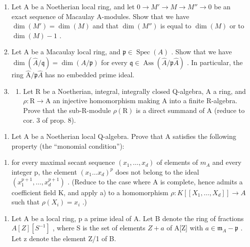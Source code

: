 
\begin{enumerate}
\def\labelenumi{\arabic{enumi})}
\item
  Let A be a Noetherian local ring, and let \(0 \to M' \to M \to M'' \to 0\) be an exact sequence of Macaulay A-modules. Show that we have \(\dim(M') = \dim(M)\) and that \(\dim(M'')\) is equal to \(\dim(M)\) or to \(\dim(M) - 1\) .
\item
  Let A be a Macaulay local ring, and \(\mathfrak{p} \in \operatorname{Spec}(A)\) . Show that we have \(\dim(\widehat{A}/\mathfrak{q}) = \dim(A/\mathfrak{p})\) for every \(\mathfrak{q} \in \operatorname{Ass}(\widehat{A}/\mathfrak{p}\widehat{A})\) . In particular, the ring \(\widehat{\mathrm{A}}/\mathfrak{p}\widehat{A}\) has no embedded prime ideal.
\item
  \begin{enumerate}
  \def\labelenumii{\alph{enumii})}
  \tightlist
  \item
    Let R be a Noetherian, integral, integrally closed Q-algebra, A a ring, and \(\rho: \mathrm{R} \to \mathrm{A}\) an injective homomorphism making A into a finite R-algebra. Prove that the sub-R-module \(\rho(\mathrm{R})\) is a direct summand of A (reduce to cor. 3 of prop. 8).
  \end{enumerate}
\end{enumerate}

\begin{enumerate}
\def\labelenumi{\alph{enumi})}
\setcounter{enumi}{1}
\tightlist
\item
  Let A be a Noetherian local Q-algebra. Prove that A satisfies the following property (the “monomial condition”):
\end{enumerate}

\begin{enumerate}
\def\labelenumi{(\Roman{enumi})}
\setcounter{enumi}{899}
\tightlist
\item
  for every maximal secant sequence \((x_{1},\ldots,x_{d})\) of elements of \(m_{A}\) and every integer p, the element \((x_{1}\ldots x_{d})^{p}\) does not belong to the ideal \((x_{1}^{p+1},\ldots,x_{d}^{p+1})\) . (Reduce to the case where A is complete, hence admits a coefficient field K, and apply a) to a homomorphism \(\rho:K[[X_{1},\ldots,X_{d}]]\to A\) such that \(\rho(X_{i})=x_{i}\) .)
\end{enumerate}

\begin{enumerate}
\def\labelenumi{\arabic{enumi})}
\setcounter{enumi}{3}
\tightlist
\item
  Let A be a local ring, p a prime ideal of A. Let B denote the ring of fractions \(A[Z][S^{-1}]\) , where S is the set of elements \(Z + a\) of A{[}Z{]} with \(a \in \mathfrak{m}_{A} - \mathfrak{p}\) . Let z denote the element Z/1 of B.
\end{enumerate}

